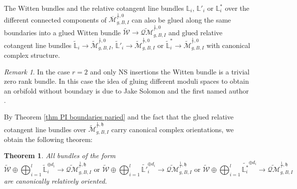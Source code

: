 \documentclass[11pt]{amsart}
\newtheorem{thm}[dummy]{Theorem}
\theoremstyle{definition}
\theoremstyle{remark}
\newtheorem{rmk}[dummy]{Remark}
\newcommand{\<}{\left<}
\renewcommand{\>}{\right>}
\numberwithin{equation}{section}
\def\Mbar{{\overline{\mathcal M}}}
\def\h{{\mathfrak h}}
\begin{document}
    
    The Witten bundles and the relative cotangent line bundles $\mathbb L_i$, $\mathbb L'_i$ or $\mathbb L_i^*$ over the different connected components of $\Mbar^{\frac{1}{r},0}_{g,B,I}$  can also be glued along the same boundaries into a glued Witten bundle $\widetilde{\mathcal W}\to\widetilde{\mathcal {QM}}^{\frac{1}{r},0}_{g,B,I}$ and glued relative cotangent line bundles $\widetilde{\mathbb L}_i\to\widetilde{\mathcal M}^{\frac{1}{r},0}_{g,B,I}$, $\widetilde{\mathbb L}'_i\to\widetilde{\mathcal M}^{\frac{1}{r},0}_{g,B,I}$ or $\widetilde{\mathbb L}^*_i\to\widetilde{\mathcal M}^{\frac{1}{r},0}_{g,B,I}$ with canonical complex structure.
\begin{rmk}
In the case $r=2$ and only NS insertions the Witten bundle is a trivial zero rank bundle. In this case the idea of gluing different moduli spaces to obtain an orbifold without boundary is due to Jake Solomon and the first named author \cite{ST_unpublished}. 
\end{rmk}
     By Theorem \ref{thm  PI boundaries paried} and the fact that the glued relative cotangent line bundles over $\widetilde{\mathcal M}^{\frac{1}{r},\h}_{g,B,I}$ carry canonical complex orientations, we obtain the following theorem:
    \begin{thm}\cite[Theorem 4.13]{TZ1}
      All bundles of the form
    \[\widetilde{{\mathcal{W}}}\oplus\bigoplus_{i=1}^l\widetilde{\mathbb{L}}_i^{\oplus d_i}\to \widetilde{\mathcal {QM}}^{\frac{1}{r},\h}_{g,B,I} 
    \text{ or } 
    \widetilde{{\mathcal{W}}}\oplus\bigoplus_{i=1}^l {\widetilde{\mathbb {L}'}}_i^{\oplus d_i}\to \widetilde{\mathcal {QM}}^{\frac{1}{r},\h}_{g,B,I}\text{ or } 
    \widetilde{{\mathcal{W}}}\oplus\bigoplus_{i=1}^l {\widetilde{\mathbb {L}^*_i}}^{\oplus d_i}\to \widetilde{\mathcal {QM}}^{\frac{1}{r},\h}_{g,B,I}\]are canonically relatively oriented.   
    \end{thm}
\end{document}
